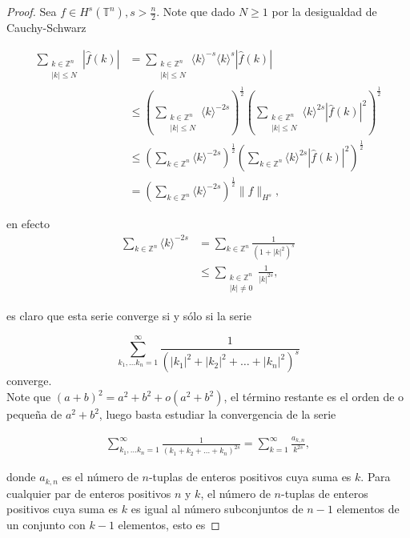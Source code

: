 \documentclass[12pt]{article}
\newcommand\Z{\ensuremath{\mathbb{Z}}}
\newcommand\T{\mathbb{T}}
\newcommand\jk{\langle k\rangle}
\begin{document}
\begin{proof}

Sea $f \in H^s(\T^n), s>\frac{n}{2}$. Note que dado $N\geq 1$ por la desigualdad de Cauchy-Schwarz

$$
\begin{aligned}
\sum_{\substack{k\in\Z^n\\
|k|\leq N}}|\widehat{f}(k)| & =\sum_{\substack{k\in\Z^n\\
|k|\leq N}}\langle k\rangle^{-s}\langle k\rangle^s|\widehat{f}(k)| \\
& \leq\left(\sum_{\substack{k\in\Z^n\\
|k|\leq N}}\langle k\rangle^{-2 s}\right)^{\frac{1}{2}}\left(\sum_{\substack{k\in\Z^n\\
|k|\leq N}}\langle k\rangle^{2 s}|\widehat{f}(k)|^2\right)^{\frac{1}{2}} \\
& \leq\left(\sum_{k\in \Z^n}\langle k\rangle^{-2 s}\right)^{\frac{1}{2}}\left(\sum_{k\in \Z^n}\langle k\rangle^{2 s}|\widehat{f}(k)|^2\right)^{\frac{1}{2}} \\
& =\left(\sum_{k\in \Z^n}\langle k\rangle^{-2 s}\right)^{\frac{1}{2}}\|f\|_{H^s},
\end{aligned}
$$

en efecto
\begin{align*}
    \sum_{k\in \Z^n}\jk^{-2s}&=\sum_{k\in \Z^n}\frac{1}{(1+|k|^2)^s}\\
    &\leq \sum_{\substack{k\in \Z^n\\
    |k|\neq 0}}\frac{1}{|k|^{2s}}
    ,\end{align*}

es claro que esta serie converge si y sólo si la serie

$$\sum_{k_1,\ldots k_n=1}^{\infty}\frac{1}{(|k_1|^2+|k_2|^2+\ldots+|k_n|^2)^s}$$
converge.\\
Note que $(a+b)^2=a^2+b^2+o(a^2+b^2)$, el término restante es el orden de o pequeña de $a^2+b^2$, luego basta estudiar la convergencia de la serie

\begin{align*}
   \sum_{k_1,\ldots k_n=1}^{\infty}\frac{1}{(k_1+k_2+\ldots+k_n)^{2s}}=\sum_{k=1}^{\infty}\frac{a_{k,n}}{k^{2s}}
,\end{align*}

donde $a_{k,n}$ es el número de $n$-tuplas de enteros  positivos cuya suma es $k$. Para cualquier par de enteros positivos $n$ y $k$, el número de $n$-tuplas de enteros positivos cuya suma es $k$ es igual al número subconjuntos de $n - 1$ elementos de un conjunto con $k - 1$ elementos, esto es


\end{proof}
\end{document}

